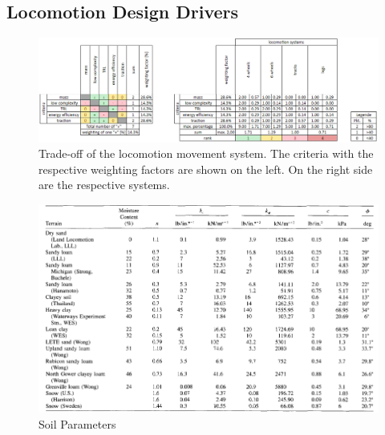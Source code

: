\subsection{Locomotion Design Drivers}
\label{app:DesignDrivers}

\begin{figure}[htb] 
  \centering
     \includegraphics[width=1\textwidth]{Media/LocomotionTradeOff.png}
  \caption{Trade-off of the locomotion movement system. The criteria with the respective weighting factors are shown on the left. On the right side are the respective systems.}
  \label{fig:TradeOffLoco}
\end{figure}


\begin{figure}[htb] 
  \centering
     \includegraphics[width=1\textwidth]{Media/SoilParameters.png}
  \caption{Soil Parameters}
  \label{fig:SoilParameters}
\end{figure}



